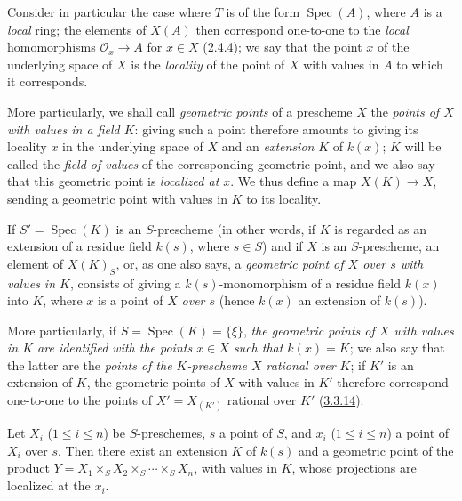 \begin{env}[3.4.5]
\label{I.3.4.5}
Consider in particular the case where $T$ is of the form
$\operatorname{Spec}(A)$, where $A$ is a \emph{local} ring; the elements of
$X(A)$ then correspond one-to-one to the \emph{local} homomorphisms
$\mathcal{O}_x\to A$ for $x\in X$ (\hyperref[I.2.4.4]{2.4.4}); we say that
the point $x$ of the underlying space of $X$ is the \emph{locality} of the point
of $X$ with values in $A$ to which it corresponds.

More particularly, we shall call \emph{geometric points} of a prescheme
$X$ the \emph{points of $X$ with values in a field $K$}: giving such a
point therefore amounts to giving its
locality $x$ in the underlying space of $X$ and an \emph{extension} $K$ of
$k(x)$; $K$ will be called the \emph{field of values} of the corresponding
geometric point, and we also say that this geometric point is \emph{localized
at $x$}. We thus define a map $X(K)\to X$, sending a geometric point with
values in $K$ to its locality.

If $S'=\operatorname{Spec}(K)$ is an $S$-prescheme (in other words, if $K$ is
regarded as an extension of a residue field $k(s)$, where $s\in S$) and if $X$
is an $S$-prescheme, an element of $X(K)_S$, or, as one also says, a
\emph{geometric point of $X$ over $s$ with values in $K$}, consists
of giving a $k(s)$-monomorphism of a residue field $k(x)$ into $K$, where
$x$ is a point of $X$ \emph{over $s$} (hence $k(x)$ an extension of
$k(s)$).

More particularly, if $S=\operatorname{Spec}(K)=\{\xi\}$, \emph{the geometric
points of $X$ with values in $K$ are identified with the points $x\in X$ such
that $k(x)=K$}; we also say that the latter are the \emph{points of the
$K$-prescheme $X$ rational over $K$}; if $K'$ is an extension of $K$, the
geometric points of $X$ with values in $K'$ therefore correspond
one-to-one to the points of $X'=X_{(K')}$ rational over $K'$
(\hyperref[I.3.3.14]{3.3.14}).
\end{env}

\begin{lemma}[3.4.6]
\label{I.3.4.6}
Let $X_i$ ($1\leq i\leq n$) be $S$-preschemes, $s$ a point of $S$, and $x_i$
($1\leq i\leq n$) a point of $X_i$ over $s$. Then there exist an
extension $K$ of $k(s)$ and a geometric point of the product
$Y=X_1\times_S X_2\times_S\cdots\times_S X_n$, with values in $K$, whose
projections are localized at the $x_i$.
\end{lemma}

